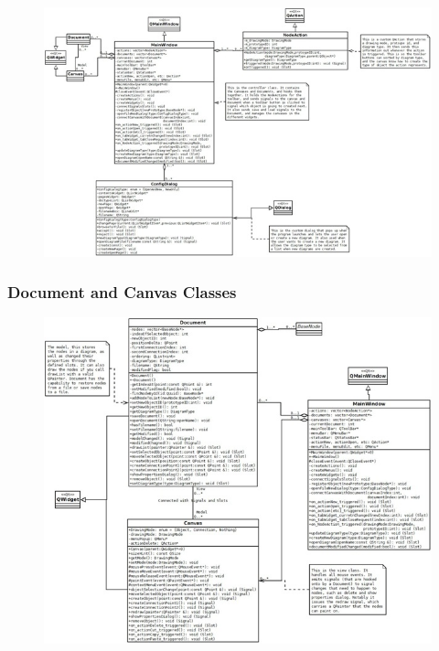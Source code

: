 \documentclass[twoside,letterpaper]{article}
\begin{document}
{\begin{figure}[h]
\centering
\includegraphics[width=6.5in]{class_mainwindow.jpeg}
\end{figure}

\clearpage
\subsubsection[\ Document and Canvas Classes ]
{\bfseries Document and Canvas Classes }

  \begin{figure}[h]
  \centering
  \includegraphics[width=6.5in]{class_documentcanvas.jpeg}
  \end{figure}

\clearpage
}
\end{document}
